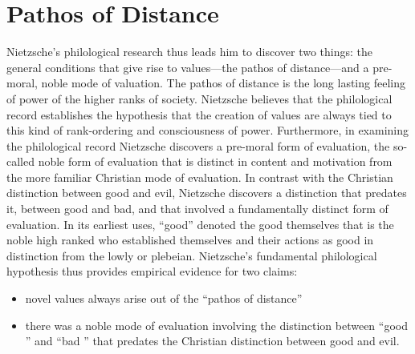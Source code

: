\section{Pathos of Distance}\label{sec:pathos_of_distance} %

Nietzsche's philological research thus leads him to discover two things: the general conditions that give rise to values---the pathos of distance---and a pre-moral, noble mode of valuation. The pathos of distance is the long lasting feeling of power of the higher ranks of society. Nietzsche believes that the philological record establishes the hypothesis that the creation of values are always tied to this kind of rank-ordering and consciousness of power. Furthermore, in examining the philological record Nietzsche discovers a pre-moral form of evaluation, the so-called noble form of evaluation that is distinct in content and motivation from the more familiar Christian mode of evaluation. In contrast with the Christian distinction between good and evil, Nietzsche discovers a distinction that predates it, between good and bad, and that involved a fundamentally distinct form of evaluation. In its earliest uses, ``good'' denoted the good themselves that is the noble high ranked who established themselves and their actions as good in distinction from the lowly or plebeian. Nietzsche's fundamental philological hypothesis thus provides empirical evidence for two claims:
\begin{itemize}
	\item novel values always arise out of the ``pathos of distance'' 
	\item there was a noble mode of evaluation involving the distinction between ``good '' and  ``bad '' that predates the Christian distinction between good and evil.
\end{itemize}

\change

